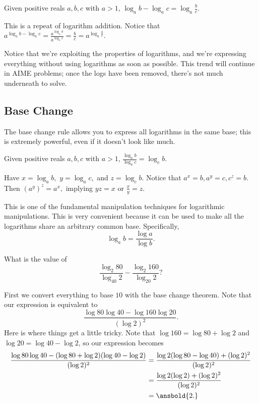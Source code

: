 \begin{theo}
Given positive reals $a,b,c$ with $a > 1$, $\log_{a}b-\log_{a}c=\log_{a}{\frac{b}{c}}.$
\end{theo}

\begin{pro}
This is a repeat of logarithm addition. Notice that $a^{\log_ab-\log_ac}=\frac{a^{\log_ab}}{ a^{\log_ac}}=\frac{b}{c}=a^{\log_a\frac{b}{c}}.$
\end{pro}

Notice that we're exploiting the properties of logarithms, and we're expressing everything without using logarithms as soon as possible. This trend will continue in AIME problems; once the logs have been removed, there's not much underneath to solve.

\subsection{Base Change}
The base change rule allows you to express all logarithms in the same base; this is extremely powerful, even if it doesn't look like much.

\begin{theo}
Given positive reals $a,b,c$ with $a > 1$, $\frac{\log_{a}b}{\log_{a}c}=\log_{c}b.$
\end{theo}

\begin{pro}
Have $x=\log_ab,$ $y=\log_ac,$ and $z=\log_cb.$ Notice that $a^x=b,a^y=c,c^z=b.$ Then $(a^y)^z=a^x,$ implying $yz=x$ or $\frac{x}{y}=z.$
\end{pro}

This is one of the fundamental manipulation techniques for logarithmic manipulations. This is very convenient because it can be used to make all the logarithms share an arbitrary common base. Specifically,
\[\log_ab=\frac{\log a}{\log b}.\]

\begin{exam}[AMC 12B 2021/9]
What is the value of \[\frac{\log_2 80}{\log_{40}2}-\frac{\log_2 160}{\log_{20}2}?\]
\end{exam}

\begin{sol}
First we convert everything to base $10$ with the base change theorem. Note that our expression is equivalent to
\[\frac{\log 80\log 40 - \log 160\log 20}{(\log 2)^2}.\]
Here is where things get a little tricky. Note that $\log 160 = \log 80 + \log 2$ and $\log 20 = \log 40 - \log 2$, so our expression becomes
\begin{align*}
\frac{\log 80\log 40 - (\log 80+\log 2)(\log 40-\log 2)}{(\log 2)^2}&=\frac{\log 2(\log 80-\log 40)+(\log 2)^2}{(\log 2)^2} \\
&=\frac{\log 2(\log 2)+(\log 2)^2}{(\log 2)^2} \\
&=\ansbold{2.}
\end{align*}
\end{sol}


